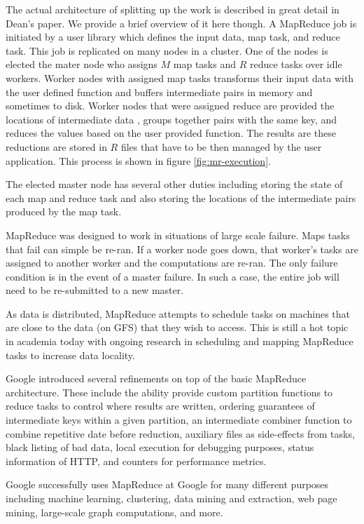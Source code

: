 \documentclass[]{article}
\begin{document}
The actual architecture of splitting up the work is described in great detail in Dean's paper. We provide a brief overview of it here though. A MapReduce job is initiated by a user library which defines the input data, map task, and reduce task. This job is replicated on many nodes in a cluster. One of the nodes is elected the mater node who assigns $M$ map tasks and $R$ reduce tasks over idle workers. Worker nodes with assigned map tasks transforms their input data with the user defined function and buffers intermediate pairs in memory and sometimes to disk. Worker nodes that were assigned reduce are provided the locations of intermediate data , groups together pairs with the same key, and reduces the values based on the user provided function. The results are these reductions are stored in $R$ files that have to be then managed by the user application. This process is shown in figure \ref{fig:mr-execution}.

The elected master node has several other duties including storing the state of each map and reduce task and also storing the locations of the intermediate pairs produced by the map task.

MapReduce was designed to work in situations of large scale failure. Maps tasks that fail can simple be re-ran. If a worker node goes down, that worker's tasks are assigned to another worker and the computations are re-ran. The only failure condition is in the event of a master failure. In such a case, the entire job will need to be re-submitted to a new master.

As data is distributed, MapReduce attempts to schedule tasks on machines that are close to the data (on GFS) that they wish to access. This is still a hot topic in academia today with ongoing research in scheduling and mapping MapReduce tasks to increase data locality.

Google introduced several refinements on top of the basic MapReduce architecture. These include the ability provide custom partition functions to reduce tasks to control where results are written, ordering guarantees of intermediate keys within a given partition, an intermediate combiner function to combine repetitive date before reduction, auxiliary files as side-effects from tasks, black listing of bad data, local execution for debugging purposes, status information of HTTP, and counters for performance metrics.

Google successfully uses MapReduce at Google for many different purposes including machine learning, clustering, data mining and extraction, web page mining, large-scale graph computations, and more.
\end{document}
